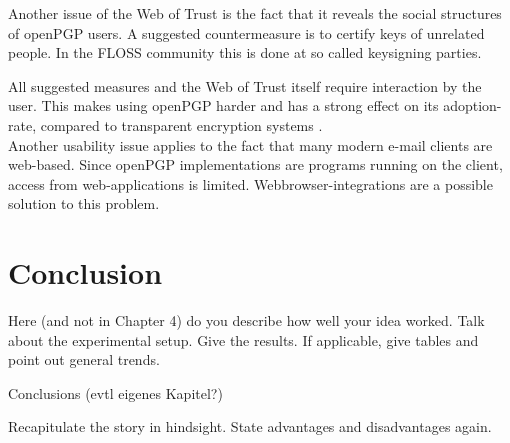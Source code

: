 Another issue of the Web of Trust is the fact that it reveals the social structures of openPGP users. A suggested countermeasure is to certify keys of unrelated people. In the FLOSS community this is done at so called keysigning parties.

All suggested measures and the Web of Trust itself require interaction by the user. This makes using openPGP harder and has a strong effect on its adoption-rate, compared to transparent encryption systems \cite{Green2014}. \\

Another usability issue applies to the fact that many modern e-mail clients are web-based. Since openPGP implementations are programs running on the client, access from web-applications is limited. Webbrowser-integrations are a possible solution to this problem. 







\chapter{Conclusion}

Here (and not in Chapter 4) do you describe how well your idea
worked. Talk about the experimental setup. Give the results. If
applicable, give tables and point out general trends.

Conclusions (evtl eigenes Kapitel?)

Recapitulate the story in hindsight. State advantages and
disadvantages again.




